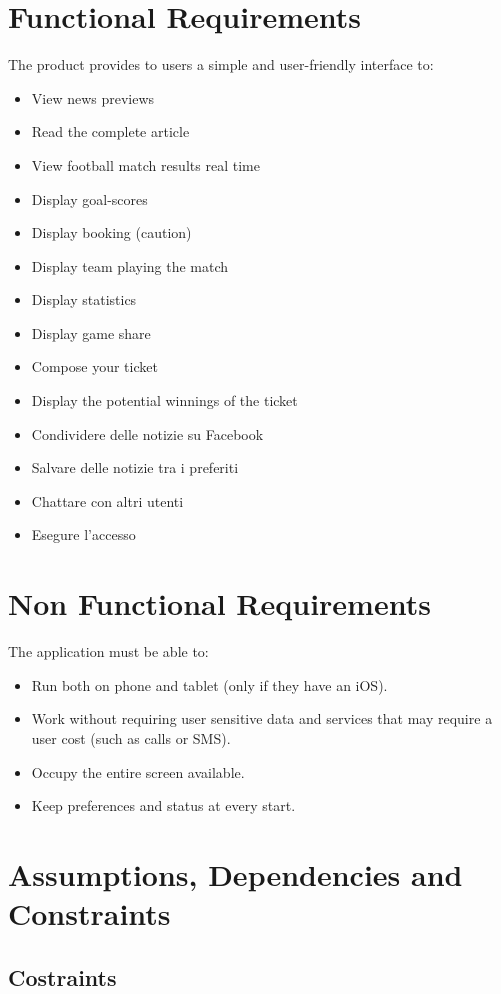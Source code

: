 \documentclass[numbers=noenddot, 12pt, a4paper, oneside]{scrbook}
\begin{document}
\section{Functional Requirements}
The product provides to users a simple and user-friendly interface to:
\begin{itemize}
	\item View news previews
	\item Read the complete article
	\item View football match results real time
	\item Display goal-scores
	\item Display booking (caution)
	\item Display team playing the match
	\item Display statistics
	\item Display game share 
	\item Compose your ticket
	\item Display the potential winnings of the ticket
	\item Condividere delle notizie su Facebook
	\item Salvare delle notizie tra i preferiti
	\item Chattare con altri utenti
	\item Esegure l'accesso
\end{itemize}
\section{Non Functional Requirements}
The application must be able to:
\begin{itemize}
	\item Run both on phone and tablet (only if they have an iOS).
	\item Work without requiring user sensitive data and services that may require a user cost (such as calls or SMS).
	\item Occupy the entire screen available.
	\item Keep preferences and status at every start.
\end{itemize}

\section{Assumptions, Dependencies and Constraints\\}

\subsection*{Costraints}
\end{document}
